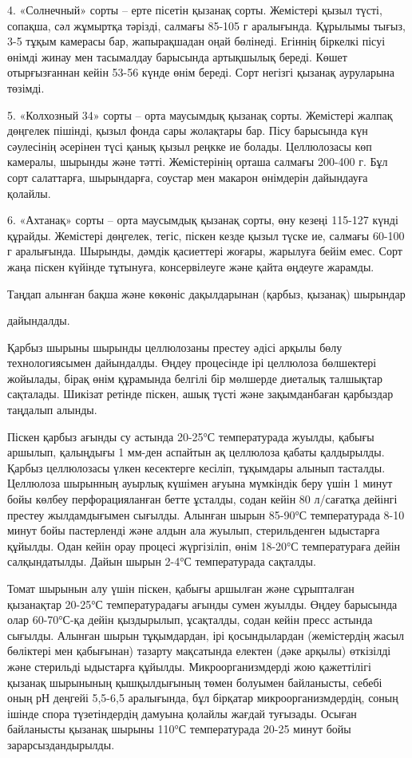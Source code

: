 \begin{multicols}{2}
4. «Солнечный» сорты -- ерте пісетін қызанақ сорты. Жемістері қызыл
түсті, сопақша, сәл жұмыртқа тәрізді, салмағы 85-105 г аралығында.
Құрылымы тығыз, 3-5 тұқым камерасы бар, жапырақшадан оңай бөлінеді.
Егіннің біркелкі пісуі өнімді жинау мен тасымалдау барысында
артықшылық береді. Көшет отырғызғаннан кейін 53-56 күнде өнім береді.
Сорт негізгі қызанақ ауруларына төзімді.

5. «Колхозный 34» сорты -- орта маусымдық қызанақ сорты. Жемістері жалпақ
дөңгелек пішінді, қызыл фонда сары жолақтары бар. Пісу барысында күн
сәулесінің әсерінен түсі қанық қызыл реңкке ие болады. Целлюлозасы көп
камералы, шырынды және тәтті. Жемістерінің орташа салмағы 200-400 г.
Бұл сорт салаттарға, шырындарға, соустар мен макарон өнімдерін
дайындауға қолайлы.

6. «Ахтанақ» сорты -- орта маусымдық қызанақ сорты, өну кезеңі 115-127
күнді құрайды. Жемістері дөңгелек, тегіс, піскен кезде қызыл түске ие,
салмағы 60-100 г аралығында. Шырынды, дәмдік қасиеттері жоғары,
жарылуға бейім емес. Сорт жаңа піскен күйінде тұтынуға, консервілеуге
және қайта өңдеуге жарамды.

Таңдап алынған бақша және көкөніс дақылдарынан (қарбыз, қызанақ)
шырындар

дайындалды.

Қарбыз шырыны шырынды целлюлозаны престеу әдісі арқылы бөлу
технологиясымен дайындалды. Өңдеу процесінде ірі целлюлоза бөлшектері
жойылады, бірақ өнім құрамында белгілі бір мөлшерде диеталық талшықтар
сақталады. Шикізат ретінде піскен, ашық түсті және зақымданбаған
қарбыздар таңдалып алынды.

Піскен қарбыз ағынды су астында 20-25°С температурада жуылды, қабығы
аршылып, қалыңдығы 1 мм-ден аспайтын ақ целлюлоза қабаты қалдырылды.
Қарбыз целлюлозасы үлкен кесектерге кесіліп, тұқымдары алынып тасталды.
Целлюлоза шырынның ауырлық күшімен ағуына мүмкіндік беру үшін 1 минут
бойы көлбеу перфорацияланған бетте ұсталды, содан кейін 80 л/сағатқа
дейінгі престеу жылдамдығымен сығылды. Алынған шырын 85-90°С
температурада 8-10 минут бойы пастерленді және алдын ала жуылып,
стерильденген ыдыстарға құйылды. Одан кейін орау процесі жүргізіліп,
өнім 18-20°С температураға дейін салқындатылды. Дайын шырын 2-4°С
температурада сақталды.

Томат шырынын алу үшін піскен, қабығы аршылған және сұрыпталған
қызанақтар 20-25°С температурадағы ағынды сумен жуылды. Өңдеу барысында
олар 60-70°С-қа дейін қыздырылып, ұсақталды, содан кейін пресс астында
сығылды. Алынған шырын тұқымдардан, ірі қосындылардан (жемістердің жасыл
бөліктері мен қабығынан) тазарту мақсатында електен (дәке арқылы)
өткізілді және стерильді ыдыстарға құйылды. Микроорганизмдерді жою
қажеттілігі қызанақ шырынының қышқылдығының төмен болуымен байланысты,
себебі оның рН деңгейі 5,5-6,5 аралығында, бұл бірқатар
микроорганизмдердің, соның ішінде спора түзетіндердің дамуына қолайлы
жағдай туғызады. Осыған байланысты қызанақ шырыны 110°С температурада
20-25 минут бойы зарарсыздандырылды.


\end{multicols}

